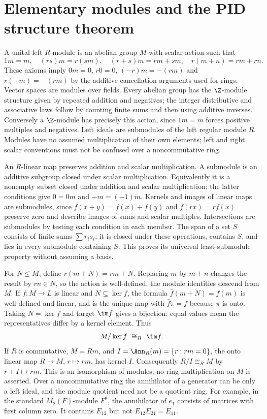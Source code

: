 \chapter{Elementary modules and the PID structure theorem}\label{chap:M07.16}

A unital left $R$-module is an abelian group $M$ with scalar action
such that
\[
 1m=m,\quad (rs)m=r(sm),\quad
 (r+s)m=rm+sm,\quad r(m+n)=rm+rn .
\]
These axioms imply $0m=0$, $r0=0$, $(-r)m=-(rm)$ and $r(-m)=-(rm)$
by the additive cancellation arguments used for rings.
Vector spaces are modules over fields. Every abelian group has the
$\Z$-module structure given by repeated addition and negatives; the
integer distributive and associative laws follow by counting finite sums
and then using additive inverses. Conversely a $\Z$-module has precisely
this action, since $1m=m$ forces positive multiples and negatives.
Left ideals are submodules of the left regular module $R$.
Modules have no assumed multiplication of their own elements; left and
right scalar conventions must not be confused over a noncommutative ring.

An $R$-linear map preserves addition and scalar multiplication.
A submodule is an additive subgroup closed under scalar multiplication.
Equivalently it is a nonempty subset closed under addition and scalar
multiplication: the latter conditions give $0=0m$ and $-m=(-1)m$.
Kernels and images of linear maps are submodules, since
$f(x+y)=f(x)+f(y)$ and $f(rx)=rf(x)$ preserve zero and describe images
of sums and scalar multiples. Intersections are submodules by testing
each condition in each member. The span of a set $S$ consists of finite
sums $\sum r_i s_i$; it is closed under these operations, contains $S$,
and lies in every submodule containing $S$. This proves its universal
least-submodule property without assuming a basis.

For $N\le M$, define $r(m+N)=rm+N$. Replacing $m$ by $m+n$
changes the result by $rn\in N$, so the action is well-defined; the
module identities descend from $M$. If $f:M\to L$ is linear and
$N\subseteq\ker f$, the formula $\bar f(m+N)=f(m)$ is well-defined
and linear, and is the unique map with $\bar f\pi=f$ because $\pi$ is
onto. Taking $N=\ker f$ and target $\im f$ gives a bijection: equal
values mean the representatives differ by a kernel element. Thus
\begin{equation}\label{eq:module-first-isomorphism}
 M/\ker f\ \cong_R\ \im f .
\end{equation}
If $R$ is commutative, $M=Rm$, and $I=\Ann_R(m)=\{r:rm=0\}$,
the onto linear map $R\to M$, $r\mapsto rm$, has kernel $I$.
Consequently $R/I\cong_R M$ by $r+I\mapsto rm$.
This is an isomorphism of modules; no ring multiplication on $M$ is
asserted. Over a noncommutative ring the annihilator of a generator
can be only a left ideal, and the module quotient need not be a quotient
ring. For example, in the standard $M_2(F)$-module $F^2$, the
annihilator of $e_1$ consists of matrices with first column zero.
It contains $E_{12}$ but not $E_{12}E_{21}=E_{11}$.

